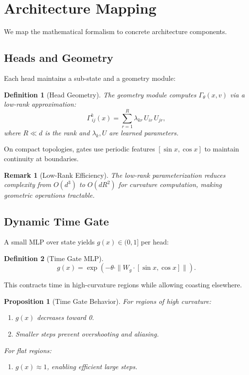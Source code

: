 \documentclass[12pt,letterpaper,twoside]{article}
\newtheorem{definition}{Definition}[section]
\newtheorem{remarque}{Remark}[section]
\newtheorem{prop}{Proposition}[section]
\begin{document}
\section{Architecture Mapping}

We map the mathematical formalism to concrete architecture components.

\subsection{Heads and Geometry}

Each head maintains a sub-state and a geometry module:

\begin{definition}[Head Geometry]
The geometry module computes $\Gamma_\theta(x, v)$ via a low-rank approximation:
\[
\Gamma^k_{\!\,ij}(x) = \sum_{r=1}^{R} \lambda_{kr} \, U_{ir} \, U_{jr},
\]
where $R \ll d$ is the rank and $\lambda_k, U$ are learned parameters.
\end{definition}

On compact topologies, gates use periodic features $[\sin x, \cos x]$ to maintain continuity at boundaries.

\begin{remarque}[Low-Rank Efficiency]
The low-rank parameterization reduces complexity from $O(d^3)$ to $O(dR^2)$ for curvature computation, making geometric operations tractable.
\end{remarque}

\subsection{Dynamic Time Gate}

A small MLP over state yields $g(x) \in (0, 1]$ per head:

\begin{definition}[Time Gate MLP]
\[
g(x) = \exp\left(-\theta \cdot \|W_g \cdot [\sin x, \cos x]\|\right).
\]
\end{definition}

This contracts time in high-curvature regions while allowing coasting elsewhere.

\begin{prop}[Time Gate Behavior]
For regions of high curvature:
\begin{enumerate}
\item $g(x)$ decreases toward 0.
\item Smaller steps prevent overshooting and aliasing.
\end{enumerate}
For flat regions:
\begin{enumerate}
\item $g(x) \approx 1$, enabling efficient large steps.
\end{enumerate}
\end{prop}
\end{document}
